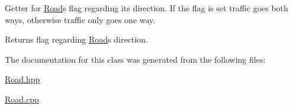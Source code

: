 Getter for \hyperlink{class_road}{Road}\textquotesingle{}s flag regarding its direction. If the flag is set traffic goes both ways, otherwise traffic only goes one way.

\begin{DoxyReturn}{Returns}
flag regarding \hyperlink{class_road}{Road}\textquotesingle{}s direction. 
\end{DoxyReturn}


The documentation for this class was generated from the following files\+:\begin{DoxyCompactItemize}
\item 
\hyperlink{_road_8hpp}{Road.\+hpp}\item 
\hyperlink{_road_8cpp}{Road.\+cpp}\end{DoxyCompactItemize}
